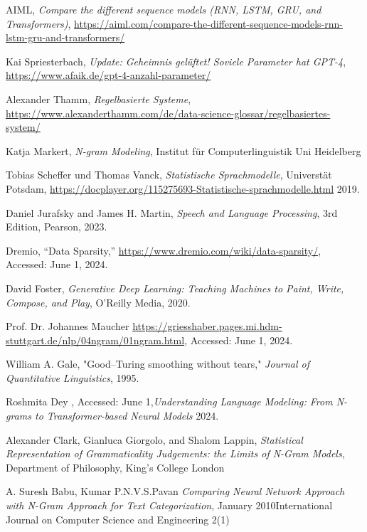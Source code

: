 \documentclass[12pt]{article}
\begin{document}
\clearpage
\begin{thebibliography}{9}

	AIML, \textit{Compare the different sequence models (RNN, LSTM, GRU, and Transformers)}, \url{https://aiml.com/compare-the-different-sequence-models-rnn-lstm-gru-and-transformers/}

	Kai Spriesterbach, \textit{Update: Geheimnis gelüftet! Soviele Parameter hat GPT-4}, \url{https://www.afaik.de/gpt-4-anzahl-parameter/}

	Alexander Thamm, \textit{Regelbasierte Systeme}, \url{https://www.alexanderthamm.com/de/data-science-glossar/regelbasiertes-system/}

	Katja Markert, \textit{N-gram Modeling}, Institut für Computerlinguistik Uni Heidelberg

	Tobias Scheffer und Thomas Vanck, \textit{Statistische Sprachmodelle}, Universtät Potsdam, \url{https://docplayer.org/115275693-Statistische-sprachmodelle.html} 2019.

	Daniel Jurafsky and James H. Martin, \textit{Speech and Language Processing}, 3rd Edition, Pearson, 2023.

	Dremio, ``Data Sparsity,'' \url{https://www.dremio.com/wiki/data-sparsity/}, Accessed: June 1, 2024.

	David Foster, \textit{Generative Deep Learning: Teaching Machines to Paint, Write, Compose, and Play}, O'Reilly Media, 2020.

	Prof. Dr. Johannes Maucher \url{https://griesshaber.pages.mi.hdm-stuttgart.de/nlp/04ngram/01ngram.html}, Accessed: June 1, 2024.

	William A. Gale, "Good–Turing smoothing without tears," \textit{Journal of Quantitative Linguistics}, 1995.

	Roshmita Dey , Accessed: June 1,\textit{Understanding Language Modeling: From N-grams to Transformer-based Neural Models} 2024.

	Alexander Clark, Gianluca Giorgolo, and Shalom Lappin, \textit{Statistical Representation of Grammaticality Judgements: the Limits of
		N-Gram Models}, Department of Philosophy, King’s College London

	A. Suresh Babu, Kumar P.N.V.S.Pavan
	\textit{Comparing Neural Network Approach with N-Gram Approach for Text Categorization},     January 2010International Journal on Computer Science and Engineering 2(1)

\end{thebibliography}
\end{document}
